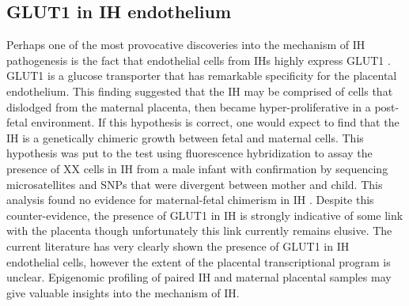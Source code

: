 \subsection{GLUT1 in IH endothelium}
Perhaps one of the most provocative discoveries into the mechanism of IH pathogenesis is the fact that endothelial cells from IHs highly express GLUT1 \citep{north2000, north2001}. GLUT1 is a glucose transporter that has remarkable specificity for the placental endothelium. This finding suggested that the IH may be comprised of cells that dislodged from the maternal placenta, then became hyper-proliferative in a post-fetal environment. If this hypothesis is correct, one would expect to find that the IH is a genetically chimeric growth between fetal and maternal cells. This hypothesis was put to the test using fluorescence  hybridization to assay the presence of XX cells in IH from a male infant with confirmation by sequencing microsatellites and SNPs that were divergent between mother and child. This analysis found no evidence for maternal-fetal chimerism in IH \citep{pittman2006}. Despite this counter-evidence, the presence of GLUT1 in IH is strongly indicative of some link with the placenta though unfortunately this link currently remains elusive. The current literature has very clearly shown the presence of GLUT1 in IH endothelial cells, however the extent of the placental transcriptional program is unclear. Epigenomic profiling of paired IH and maternal placental samples may give valuable insights into the mechanism of IH. 

